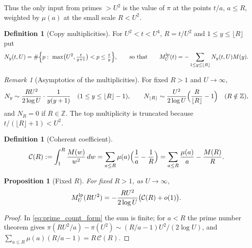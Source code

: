 \documentclass[11pt]{amsart}
\numberwithin{equation}{section}
\theoremstyle{plain}
\newtheorem{proposition}[theorem]{Proposition}
\theoremstyle{definition}
\newtheorem{definition}[theorem]{Definition}
\theoremstyle{remark}
\newtheorem{remark}[theorem]{Remark}
\newcommand{\Cc}{\mathcal{C}}
\begin{document}
Thus the only input from primes $>U^2$ is the value of $\pi$ at the points
$t/a$, $a\le R$, weighted by $\mu(a)$ at the small scale $R<U^2$.

\begin{definition}[Copy multiplicities]
\label{def:copy-multiplicity}
For $U^2<t<U^4$, $R=t/U^2$ and $1\le y\le\lfloor R\rfloor$ put
\begin{equation}
\label{eq:Ny-exact}
  N_y(t,U)=\#\Bigl\{p:\ \max\bigl(U^2,\tfrac{t}{y+1}\bigr)<p\le\tfrac ty\Bigr\},
  \qquad\text{so that}\qquad
  M^{\rm lp}_U(t)=-\sum_{1\le y\le\lfloor R\rfloor}N_y(t,U)M(y).
\end{equation}
\end{definition}

\begin{remark}[Asymptotics of the multiplicities]
\label{rem:copy-count-asymptotic}
For fixed $R>1$ and $U\to\infty$,
\begin{equation}
\label{eq:Ny-fixed-R}
  N_y\sim\frac{RU^2}{2\log U}\cdot\frac1{y(y+1)}\quad(1\le y\le\lfloor R\rfloor-1),
  \qquad
  N_{\lfloor R\rfloor}\sim\frac{U^2}{2\log U}\Bigl(\frac R{\lfloor R\rfloor}-1\Bigr)
  \quad(R\notin\mathbb{Z}),
\end{equation}
and $N_R=0$ if $R\in\mathbb{Z}$. The top multiplicity is truncated because
$t/(\lfloor R\rfloor+1)<U^2$.
\end{remark}

\begin{definition}[Coherent coefficient]
\label{def:coherent_coefficient}
\begin{equation}
\label{eq:C_def}
  \Cc(R):=\int_1^R\frac{M(w)}{w^2}\,dw
  =\sum_{a\le R}\mu(a)\Bigl(\frac1a-\frac1R\Bigr)
  =\sum_{a\le R}\frac{\mu(a)}a-\frac{M(R)}R .
\end{equation}
\end{definition}

\begin{proposition}[Fixed $R$]
\label{prop:fixed_R_corrected}
For fixed $R>1$, as $U\to\infty$,
\begin{equation}
\label{eq:E_fixed_R}
  M^{\rm lp}_U(RU^2)=-\frac{RU^2}{2\log U}\bigl(\Cc(R)+o(1)\bigr).
\end{equation}
\end{proposition}

\begin{proof}
In \eqref{eq:prime_count_form} the sum is finite; for $a<R$ the prime number
theorem gives $\pi(RU^2/a)-\pi(U^2)\sim(R/a-1)U^2/(2\log U)$, and
$\sum_{a\le R}\mu(a)(R/a-1)=R\,\Cc(R)$.
\end{proof}
\end{document}
